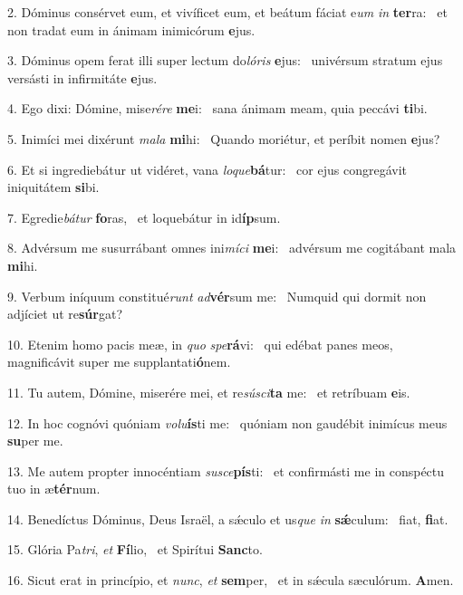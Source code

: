 2. Dóminus consérvet eum, et vivíficet eum, et beátum fáciat e\textit{um} \textit{in} \textbf{ter}ra: \ast\  et non tradat eum in ánimam inimicórum \textbf{e}jus.\

3. Dóminus opem ferat illi super lectum do\textit{ló}\textit{ris} \textbf{e}jus: \ast\  univérsum stratum ejus versásti in infirmitáte \textbf{e}jus.\

4. Ego dixi: Dómine, mise\textit{ré}\textit{re} \textbf{me}i: \ast\  sana ánimam meam, quia peccávi \textbf{ti}bi.\

5. Inimíci mei dixérunt \textit{ma}\textit{la} \textbf{mi}hi: \ast\  Quando moriétur, et períbit nomen \textbf{e}jus?\

6. Et si ingrediebátur ut vidéret, vana \textit{lo}\textit{que}\textbf{bá}tur: \ast\  cor ejus congregávit iniquitátem \textbf{si}bi.\

7. Egredie\textit{bá}\textit{tur} \textbf{fo}ras, \ast\  et loquebátur in id\textbf{íp}sum.\

8. Advérsum me susurrábant omnes ini\textit{mí}\textit{ci} \textbf{me}i: \ast\  advérsum me cogitábant mala \textbf{mi}hi.\

9. Verbum iníquum constitué\textit{runt} \textit{ad}\textbf{vér}sum me: \ast\  Numquid qui dormit non adjíciet ut re\textbf{súr}gat?\

10. Etenim homo pacis meæ, in \textit{quo} \textit{spe}\textbf{rá}vi: \ast\  qui edébat panes meos, magnificávit super me supplantati\textbf{ó}nem.\

11. Tu autem, Dómine, miserére mei, et re\textit{sú}\textit{sci}\textbf{ta} me: \ast\  et retríbuam \textbf{e}is.\

12. In hoc cognóvi quóniam \textit{vo}\textit{lu}\textbf{ís}ti me: \ast\  quóniam non gaudébit inimícus meus \textbf{su}per me.\

13. Me autem propter innocéntiam \textit{su}\textit{sce}\textbf{pís}ti: \ast\  et confirmásti me in conspéctu tuo in æ\textbf{tér}num.\

14. Benedíctus Dóminus, Deus Israël, a sǽculo et us\textit{que} \textit{in} \textbf{sǽ}culum: \ast\  fiat, \textbf{fi}at.\

15. Glória Pa\textit{tri}, \textit{et} \textbf{Fí}lio, \ast\  et Spirítui \textbf{Sanc}to.\

16. Sicut erat in princípio, et \textit{nunc}, \textit{et} \textbf{sem}per, \ast\  et in sǽcula sæculórum. \textbf{A}men.\

